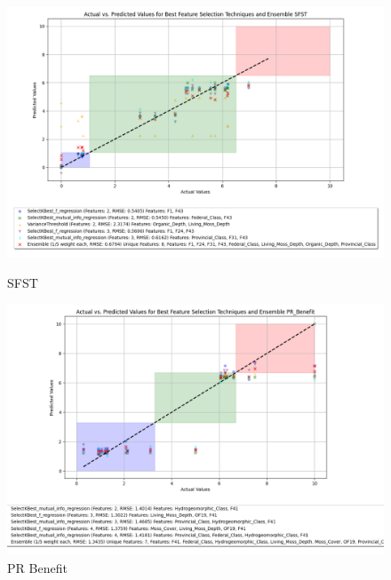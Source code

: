 \begin{figure}[H]
    \centering
    \begin{minipage}{0.45\textwidth}
        \centering
        \includegraphics[width=\linewidth]{reg_section_specxtra/images_reg_featred_ensemble/actual_vs_predicted_smallest_feature_selection_and_ensemble_SFST.png}
        \caption{SFST}
        \label{fig_reg_specxtra:sfst_reg_featred_smallest_ensemble}
    \end{minipage}\hfill
    \begin{minipage}{0.45\textwidth}
        \centering
        \includegraphics[width=\linewidth]{reg_section_specxtra/images_reg_featred_ensemble/actual_vs_predicted_smallest_feature_selection_and_ensemble_PR_Benefit.png}
        \caption{PR Benefit}
        \label{fig_reg_specxtra:pr_ben_reg_featred_smallest_ensemble}
    \end{minipage}
\end{figure}

